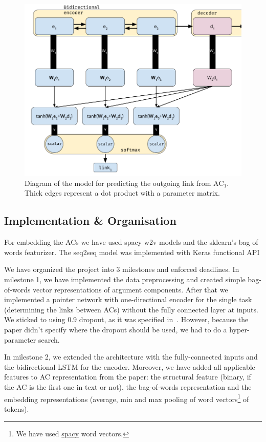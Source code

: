 \documentclass[onecolumn]{article}
\begin{document}
\begin{figure}[h]
    \centering
    \includegraphics[width=0.8\linewidth]{fig/link.png}
    \caption{Diagram of the model for predicting the outgoing link from $\text{AC}_1$. Thick edges represent a dot product with a parameter matrix.}\label{fig:link}
\end{figure}

\subsection{Implementation \& Organisation}
For embedding the ACs we have used spacy w2v models and the sklearn's bag of words featurizer.
The seq2seq model was implemented with Keras functional API

We have organized the project into 3 milestones and enforced deadlines.
In milestone 1, we have implemented the data preprocessing and created simple bag-of-words vector representations of argument components.
After that we implemented a pointer network with one-directional encoder for the single task (determining the links between ACs) without the fully connected layer at inputs.
We sticked to using $0.9$ dropout, as it was specified in~\cite{potash2017here}.
However, because the paper didn't specify where the dropout should be used, we had to do a hyper-parameter search.

In milestone 2, we extended the architecture with the fully-connected inputs and the bidirectional LSTM for the encoder.
Moreover, we have added all applicable features to AC representation from the paper: the structural feature
(binary, if the AC is the first one in text or not), the bag-of-words representation and the embedding representations (average, min and max pooling
of word vectors\footnote{We have used \href{https://github.com/explosion/spacy-models/releases/tag/en_vectors_web_lg-2.0.0}{spacy} word vectors.} of tokens).
\end{document}
